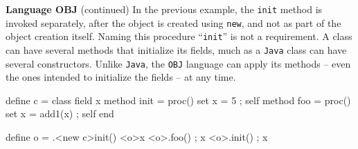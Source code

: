 \begin{minipage}[t]{\sw}
\slidenumber
\LARGE
{\bf Language OBJ} (continued)\exx
In the previous example,
the \verb'init' method is invoked separately,
after the object is created using \verb'new',
and not as part of the object creation itself.
Naming this procedure ``\verb'init''' is not a requirement.
A class can have several methods that initialize its fields,
much as a \verb'Java' class can have several constructors.
Unlike \verb'Java', the \verb'OBJ' language can apply its methods --
even the ones intended to initialize the fields --
at any time.
\begin{qv}
define c =
    class
        field x
        method init = proc() {set x = 5 ; self}
        method foo = proc() {set x = add1(x) ; self}
    end

define o = .<new c>init()
<o>x              %
<o>{.foo() ; x}   %
<o>{.init() ; x } %
\end{qv}
\end{minipage}
